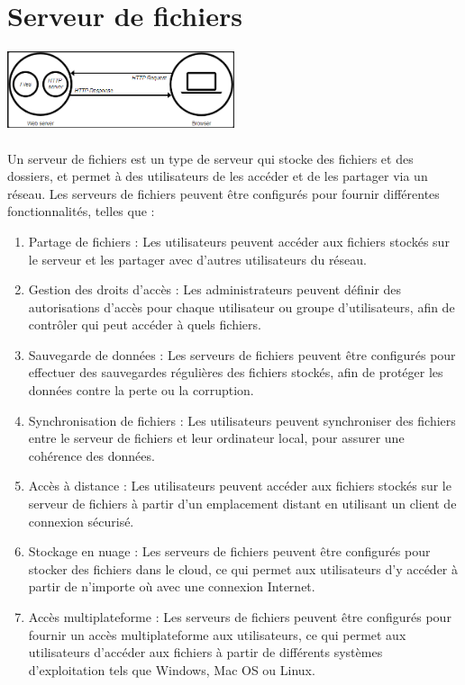 \section{Serveur de fichiers}
\vspace{4mm}
\paragraph{
	\includegraphics[width=0.5\textwidth]{Server_web.png}}
\paragraph{ }
Un serveur de fichiers est un type de serveur qui stocke des fichiers et des dossiers, et permet à des utilisateurs de les accéder et de les partager via un réseau. Les serveurs de fichiers peuvent être configurés pour fournir différentes fonctionnalités, telles que :
\begin{enumerate}
 \item   Partage de fichiers : Les utilisateurs peuvent accéder aux fichiers stockés sur le serveur et les partager avec d'autres utilisateurs du réseau.
 
 \item Gestion des droits d'accès : Les administrateurs peuvent définir des autorisations d'accès pour chaque utilisateur ou groupe d'utilisateurs, afin de contrôler qui peut accéder à quels fichiers.
 
 \item Sauvegarde de données : Les serveurs de fichiers peuvent être configurés pour effectuer des sauvegardes régulières des fichiers stockés, afin de protéger les données contre la perte ou la corruption.
 
 \item Synchronisation de fichiers : Les utilisateurs peuvent synchroniser des fichiers entre le serveur de fichiers et leur ordinateur local, pour assurer une cohérence des données.
 
 \item Accès à distance : Les utilisateurs peuvent accéder aux fichiers stockés sur le serveur de fichiers à partir d'un emplacement distant en utilisant un client de connexion sécurisé.
 
  \item Stockage en nuage : Les serveurs de fichiers peuvent être configurés pour stocker des fichiers dans le cloud, ce qui permet aux utilisateurs d'y accéder à partir de n'importe où avec une connexion Internet.
 
\item Accès multiplateforme : Les serveurs de fichiers peuvent être configurés pour fournir un accès multiplateforme aux utilisateurs, ce qui permet aux utilisateurs d'accéder aux fichiers à partir de différents systèmes d'exploitation tels que Windows, Mac OS ou Linux.
 
\end{enumerate}
